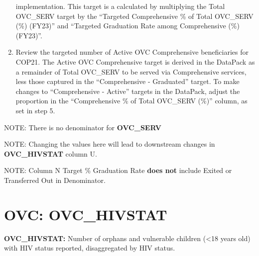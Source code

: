 \documentclass[
  openany]{book}
\begin{document}
\begin{enumerate}
  implementation. This target is a calculated by multiplying the Total
  OVC\_SERV target by the ``Targeted Comprehensive \% of Total OVC\_SERV
  (\%) (FY23)'' and ``Targeted Graduation Rate among Comprehensive (\%)
  (FY23)''.
\item
  Review the targeted number of Active OVC Comprehensive beneficiaries
  for COP21. The Active OVC Comprehensive target is derived in the
  DataPack as a remainder of Total OVC\_SERV to be served via
  Comprehensive services, less those captured in the ``Comprehensive -
  Graduated'' target. To make changes to ``Comprehensive - Active''
  targets in the DataPack, adjust the proportion in the ``Comprehensive
  \% of Total OVC\_SERV (\%)'' column, as set in step 5.
\end{enumerate}

NOTE: There is no denominator for \textbf{OVC\_SERV}

NOTE: Changing the values here will lead to downstream changes in
\textbf{OVC\_HIVSTAT} column U.

NOTE: Column N Target \% Graduation Rate \textbf{does not} include Exited or
Transferred Out in Denominator.

\textbf{\emph{\hfill\break
}}

\hypertarget{ovc-ovc_hivstat}{%
\section{OVC: OVC\_HIVSTAT}\label{ovc-ovc_hivstat}}

\textbf{OVC\_HIVSTAT:} Number of orphans and vulnerable children (\textless18 years
old) with HIV status reported, disaggregated by HIV status.

\begin{table}
\centering\begingroup\fontsize{12}{14}\selectfont

\endgroup{}
\end{table}
\end{document}
